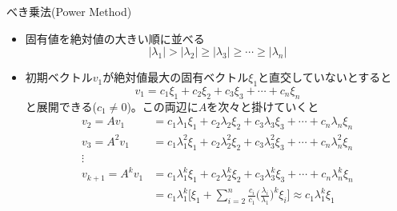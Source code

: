 \begin{frame}[t,fragile]{べき乗法(Power Method)}
  \begin{itemize}
  \item 固有値を絶対値の大きい順に並べる
    \[
    |\lambda_1| > |\lambda_2| \ge |\lambda_3| \ge \cdots \ge |\lambda_n|
    \]
  \item 初期ベクトル$v_1$が絶対値最大の固有ベクトル$\xi_1$と直交していないとすると
    \[
    v_1 = c_1 \xi_1 + c_2 \xi_2 + c_3 \xi_3 + \cdots + c_n \xi_n
    \]
    と展開できる($c_1 \ne 0$)。この両辺に$A$を次々と掛けていくと
    \begin{align*}
      v_2 = A v_1 &= c_1 \lambda_1 \xi_1 + c_2 \lambda_2 \xi_2 + c_3 \lambda_3 \xi_3 + \cdots + c_n \lambda_n \xi_n \\
      v_3 = A^2 v_1 &= c_1 \lambda_1^2 \xi_1 + c_2 \lambda_2^2 \xi_2 + c_3 \lambda_3^2 \xi_3 + \cdots + c_n \lambda_n^2 \xi_n \\
      \vdots \\
      v_{k+1} = A^k v_1 &= c_1 \lambda_1^k \xi_1 + c_2 \lambda_2^k \xi_2 + c_3 \lambda_3^k \xi_3 + \cdots + c_n \lambda_n^k \xi_n \\
      &= c_1 \lambda_1^k \Big[ \xi_1 + \sum_{i=2}^n \frac{c_i}{c_1} \big( \frac{\lambda_i}{\lambda_1}\big)^k \xi_i \Big] \approx c_1 \lambda_1^k \xi_1 \\
    \end{align*}
  \end{itemize}
\end{frame}
